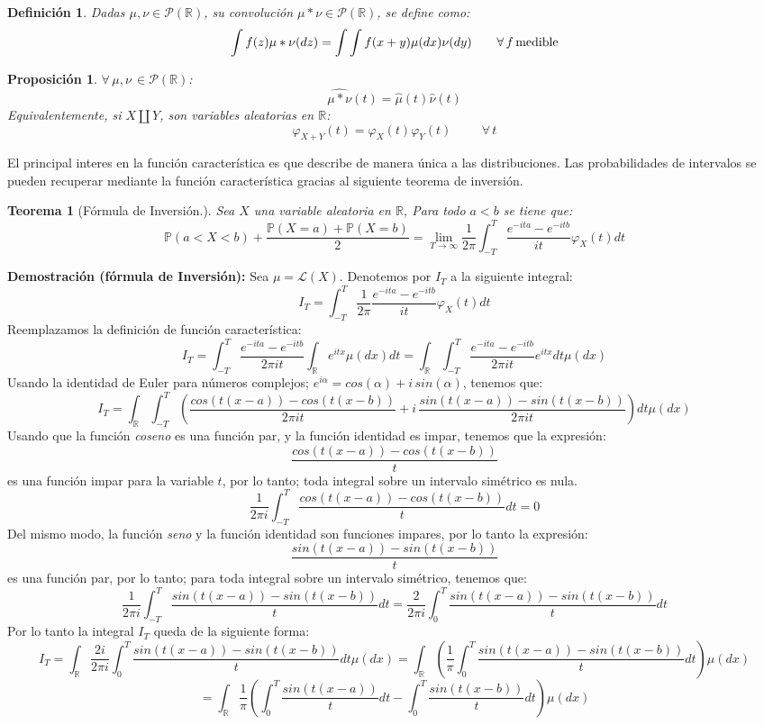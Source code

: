 \documentclass[a4paper]{article}
\newtheorem{definicion}{Definición}
\newtheorem{teorema}{Teorema}
\newtheorem{prop}{Proposici\'on}
\numberwithin{equation}{subsection}
\def\R{\mathbb R}
\def\to{\rightarrow}
\newcommand{\pb}{\mathbb{P}}
\begin{document}
\begin{definicion} Dadas $\mu,\nu \in \mathcal{P}(\R)$, su convolución $\mu\ast \nu \in \mathcal{P}(\R)$, se define como:
\[\int f(z)\mu\ast\nu(dz) = \int\int f(x+y)\mu(dx)\nu(dy)\hspace{0.7cm}\forall\,f\,\text{medible}\]
\end{definicion}
\begin{prop}$\forall\,\mu,\nu\,\in\mathcal{P}(\R)$:
\[\widehat{\mu\ast\nu}(t) = \hat{\mu}(t)\hat{\nu}(t)\]
Equivalentemente, si $X\amalg Y$, son variables aleatorias en $\R$:
\[\varphi_{X+Y}(t) = \varphi_X(t)\varphi_Y(t)\hspace{1cm}\forall\,t\]
\end{prop}

El principal interes en la función característica es que describe de manera única a las distribuciones. Las probabilidades de intervalos se pueden recuperar mediante la función característica gracias al siguiente teorema de inversión.

\begin{teorema}[Fórmula de Inversión.] Sea $X$ una variable aleatoria en $\R$, Para todo $a<b$ se tiene que:
\[\pb(a<X<b) + \frac{\pb(X=a)+\pb(X=b)}{2} = \lim_{T\to \infty}\frac{1}{2\pi}\int_{-T}^{T}\frac{e^{-ita}-e^{-itb}}{it}\varphi_X(t)dt\]
\end{teorema}
\textbf{Demostración (fórmula de Inversión):} Sea $\mu = \mathcal{L}(X)$. Denotemos por $I_T$ a la siguiente integral:
\[I_T = \int_{-T}^{T}\frac{1}{2\pi}\frac{e^{-ita}-e^{-itb}}{it}\varphi_X(t) dt\]
Reemplazamos la definición de función característica:
\[I_T = \int_{-T}^{T}\frac{e^{-ita}-e^{-itb}}{2\pi it}\int_{\R}e^{itx}\mu(dx) dt = \int_{\R}\int_{-T}^{T}\frac{e^{-ita}-e^{-itb}}{2\pi it}e^{itx}dt\mu(dx)\]
Usando la identidad de Euler para números complejos; $e^{i\alpha} = cos(\alpha)+i\,sin(\alpha)$, tenemos que:
\[I_T = \int_{\R}\int_{-T}^{T}\left(\frac{cos(t(x-a))-cos(t(x-b))}{2\pi it} + i\,\frac{sin(t(x-a))-sin(t(x-b))}{2\pi it}\right)dt \mu(dx)\]
Usando que la función \textit{coseno} es una función par, y la función identidad es impar, tenemos que la expresión:
\[\frac{cos(t(x-a))-cos(t(x-b))}{t}\]
es una función impar para la variable $t$, por lo tanto; toda integral sobre un intervalo simétrico es nula.
\[\frac{1}{2\pi i}\int_{-T}^{T}\frac{cos(t(x-a))-cos(t(x-b))}{t} dt = 0\]
Del mismo modo, la función \textit{seno} y la función identidad son funciones impares, por lo tanto la expresión:
\[\frac{sin(t(x-a))-sin(t(x-b))}{t}\]
es una función par, por lo tanto; para toda integral sobre un intervalo simétrico, tenemos que:
\[\frac{1}{2\pi i}\int_{-T}^{T}\frac{sin(t(x-a))-sin(t(x-b))}{t}dt = \frac{2}{2\pi i}\int_{0}^{T}\frac{sin(t(x-a))-sin(t(x-b))}{t}dt\]
Por lo tanto la integral $I_T$ queda de la siguiente forma:
\[I_T = \int_{\R}\frac{2i}{2\pi i}\int_{0}^{T}\frac{sin(t(x-a))-sin(t(x-b))}{t}dt \mu(dx)=\int_{\R}\left(\frac{1}{\pi }\int_{0}^{T}\frac{sin(t(x-a))-sin(t(x-b))}{t}dt\right) \mu(dx)\]
\[= \int_{\R}\frac{1}{\pi}\left(\int_{0}^{T}\frac{sin(t(x-a))}{t}dt - \int_{0}^{T}\frac{sin(t(x-b))}{t}dt\right) \mu(dx)\]
\end{document}
